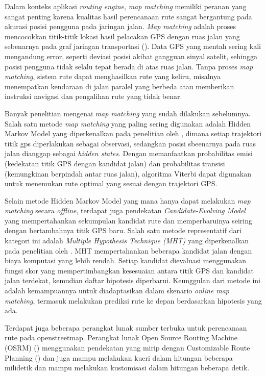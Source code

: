 Dalam konteks aplikasi \textit{routing engine}, \textit{map matching} memiliki peranan yang sangat penting karena kualitas hasil perencanaan rute sangat bergantung pada akurasi posisi pengguna pada jaringan jalan. \textit{Map matching} adalah proses mencocokkan titik-titik lokasi hasil pelacakan GPS dengan ruas jalan yang sebenarnya pada graf jaringan transportasi (\cite{Newson2009}). Data GPS yang mentah sering kali mengandung error, seperti deviasi posisi akibat gangguan sinyal satelit, sehingga posisi pengguna tidak selalu tepat berada di atas ruas jalan. Tanpa proses \textit{map matching}, sistem rute dapat menghasilkan rute yang keliru, misalnya menempatkan kendaraan di jalan paralel yang berbeda atau memberikan instruksi navigasi dan pengalihan rute yang tidak benar.


Banyak penelitian mengenai \textit{map matching} yang sudah dilakukan sebelumnya. Salah satu metode \textit{map matching} yang paling sering digunakan adalah Hidden Markov Model yang diperkenalkan pada penelitian oleh \cite{Newson2009}, dimana setiap trajektori titik gps diperlakukan sebagai observasi, sedangkan posisi sbeenarnya pada ruas jalan dianggap sebagai \textit{hidden states}. Dengan memanfaatkan probabilitas emisi (kedekatan titik GPS dengan kandidat jalan) dan probabilitas transisi (kemungkinan berpindah antar ruas jalan), algoritma Viterbi dapat digunakan untuk menemukan rute optimal yang sesuai dengan trajektori GPS.

Selain metode Hidden Markov Model yang mana hanya dapat melakukan \textit{map matching} secara \textit{offline}, terdapat juga pendekatan \textit{Candidate-Evolving Model} yang mempertahankan sekumpulan kandidat rute dan memperbaruinya seiring dengan bertambahnya titik GPS baru. Salah satu metode representatif dari kategori ini adalah \textit{Multiple Hypothesis Technique (MHT)} yang diperkenalkan pada penelitian oleh \cite{Taguchi2019}. MHT mempertahankan beberapa kandidat jalan dengan biaya komputasi yang lebih rendah. Setiap kandidat dievaluasi menggunakan fungsi skor yang mempertimbangkan kesesuaian antara titik GPS dan kandidat jalan terdekat, kemudian daftar hipotesis diperbarui. Keunggulan dari metode ini adalah kemampuannya untuk diadaptasikan dalam skenario \textit{online map matching}, termasuk melakukan prediksi rute ke depan berdasarkan hipotesis yang ada. 

Terdapat juga beberapa perangkat lunak sumber terbuka untuk perencanaan rute pada openstreetmap. Perangkat lunak Open Source Routing Machine (OSRM)  (\cite{Luxen2011}) menggunakan pendekatan yang mirip dengan Customizable Route Planning (\cite{Delling2015}) dan juga mampu melakukan kueri dalam hitungan beberapa milidetik dan mampu melakukan kustomisasi dalam hitungan beberapa detik.



